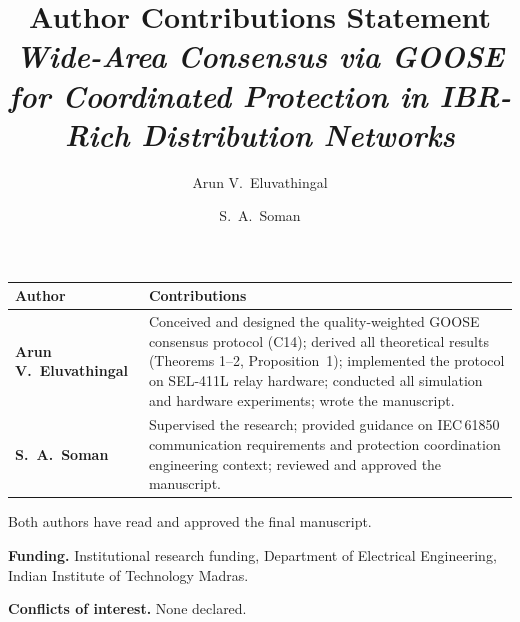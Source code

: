 \documentclass[11pt,a4paper]{article}
\title{Author Contributions Statement\\[4pt]
\large\textit{Wide-Area Consensus via GOOSE for Coordinated
Protection in IBR-Rich Distribution Networks}}
\author{Arun V.\ Eluvathingal \and S.\ A.\ Soman}
\date{}
\begin{document}
\maketitle
\thispagestyle{empty}

\bigskip
\begin{tabular}{@{}>{\bfseries}p{3.8cm}p{10cm}@{}}
\toprule
Author & Contributions \\
\midrule
Arun V.\ Eluvathingal &
  Conceived and designed the quality-weighted GOOSE consensus
  protocol (C14); derived all theoretical results (Theorems 1--2,
  Proposition~1); implemented the protocol on SEL-411L relay
  hardware; conducted all simulation and hardware experiments;
  wrote the manuscript. \\[6pt]
S.\ A.\ Soman &
  Supervised the research; provided guidance on IEC\,61850
  communication requirements and protection coordination
  engineering context; reviewed and approved the manuscript. \\
\bottomrule
\end{tabular}

\bigskip\noindent
Both authors have read and approved the final manuscript.

\bigskip\noindent
\textbf{Funding.}
Institutional research funding, Department of Electrical Engineering,
Indian Institute of Technology Madras.

\bigskip\noindent
\textbf{Conflicts of interest.} None declared.
\end{document}

